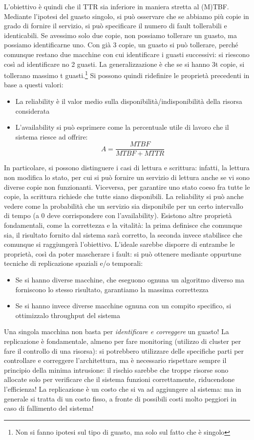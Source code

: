 L'obiettivo è quindi che il TTR sia inferiore in maniera stretta al (M)TBF.
Mediante l'ipotesi del guasto singolo, si può osservare che se abbiamo più copie in grado di fornire il servizio, si
può specificare il numero di fault tollerabili e identicabili. Se avessimo solo due copie, non possiamo tollerare un
guasto, ma possiamo identificarne uno. Con già 3 copie, un guasto si può tollerare,
perché comunque restano due macchine con cui identificare i guasti successivi:
si riescono così ad identificare no 2 guasti. La generalizzazione è che se si hanno 3t copie, si tollerano massimo t
guasti.\footnote{Non si fanno ipotesi sul tipo di guasto, ma solo sul fatto che è singolo} Si possono quindi
ridefinire le proprietà precedenti in base a questi valori:
\begin{itemize}
 \item La reliability è il valor medio sulla disponibilità/indisponibilità della risorsa considerata
 \item L'availability si può esprimere come la percentuale utile di lavoro che il sistema riesce ad offrire:
 \begin{equation}
  A = \frac{MTBF}{MTBF + MTTR}
 \end{equation}
\end{itemize}
In particolare, si possono distinguere i casi di lettura e scrittura: infatti, la lettura non modifica lo stato, per
cui si può fornire un servizio di lettura anche se vi sono diverse copie non funzionanti. Viceversa, per garantire uno
stato coeso fra tutte le copie, la scrittura richiede che tutte siano disponibili.
La reliability si può anche vedere come la probabilità che un servizio sia disponibile per un certo intervallo di 
tempo (a 0 deve corrispondere con l'availability).
Esistono altre proprietà fondamentali, come la correttezza e la vitalità: la prima definisce che comunque sia, il
risultato fornito dal sistema sarà corretto, la seconda invece stabilisce che comunque si raggiungerà l'obiettivo.
L'ideale sarebbe disporre di entrambe le proprietà, così da poter mascherare i fault: si può ottenere mediante 
oppurtune tecniche di replicazione spaziali e/o temporali:
\begin{itemize}
 \item Se si hanno diverse macchine, che eseguono ognuna un algoritmo diverso ma forniscono lo stesso risultato,
 garantiamo la massima correttezza
 \item Se si hanno invece diverse macchine ognuna con un compito specifico, si ottimizzalo throughput del sistema
\end{itemize}
Una singola macchina non basta per \textit{identificare e correggere} un guasto! La replicazione è fondamentale,
almeno per fare monitoring (utilizzo di cluster per fare il controllo di una risorsa): si potrebbero utilizzare delle
specifiche parti per controllare e correggere l'architettura, ma è necessario rispettare sempre il principio della minima
intrusione: il rischio sarebbe che troppe risorse sono allocate solo per verificare che il sistema funzioni correttamente,
riducendone l'efficienza! La replicazione è un costo che si va ad aggiungere al sistema: ma in generale si tratta di un
costo fisso, a fronte di possibili costi molto peggiori in caso di fallimento del sistema!

